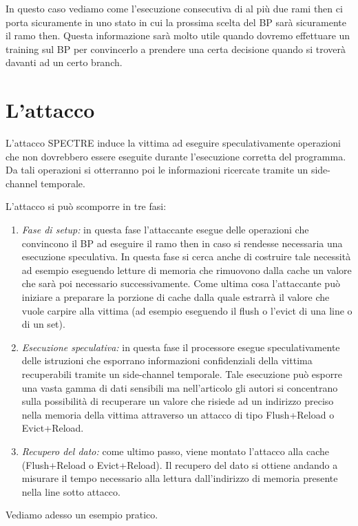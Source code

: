 			In questo caso vediamo come l'esecuzione consecutiva di al più due rami then ci porta sicuramente in uno stato in cui la prossima scelta del \ac{BP} sarà sicuramente il ramo then. Questa informazione sarà molto utile quando dovremo effettuare un training sul \ac{BP} per convincerlo a prendere una certa decisione quando si troverà davanti ad un certo branch.
			
	\section{L'attacco}
		L'attacco SPECTRE induce la vittima ad eseguire speculativamente operazioni che non dovrebbero essere eseguite durante l'esecuzione corretta del programma. Da tali operazioni si otterranno poi le informazioni ricercate tramite un side-channel temporale.
		
		L'attacco si può scomporre in tre fasi:
		
		\begin{enumerate}
			\item \emph{Fase di setup:} in questa fase l'attaccante esegue delle operazioni che convincono il \ac{BP} ad eseguire il ramo then in caso si rendesse necessaria una esecuzione speculativa. In questa fase si cerca anche di costruire tale necessità ad esempio eseguendo letture di memoria che rimuovono dalla cache un valore che sarà poi necessario successivamente. Come ultima cosa l'attaccante può iniziare a preparare la porzione di cache dalla quale estrarrà il valore che vuole carpire alla vittima (ad esempio eseguendo il flush o l'evict di una line o di un set).
			\item \emph{Esecuzione speculativa:} in questa fase il processore esegue speculativamente delle istruzioni che esporrano informazioni confidenziali della vittima recuperabili tramite un side-channel temporale. Tale esecuzione può esporre una vasta gamma di dati sensibili ma nell'articolo gli autori si concentrano sulla possibilità di recuperare un valore che risiede ad un indirizzo preciso nella memoria della vittima attraverso un attacco di tipo Flush+Reload o Evict+Reload.
			\item \emph{Recupero del dato:} come ultimo passo, viene montato l'attacco alla cache (Flush+Reload o Evict+Reload). Il recupero del dato si ottiene andando a misurare il tempo necessario alla lettura dall'indirizzo di memoria presente nella line sotto attacco.
		\end{enumerate}
	
		Vediamo adesso un esempio pratico.
		
